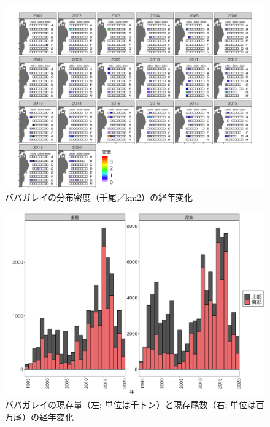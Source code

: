 \documentclass[11pt]{article} %
\begin{document}
\begin{linenumbers}
\begin{figure}[h]
  \centering
  \includegraphics[width = 14cm]{ババガレイdens.png}
  \caption{ババガレイの分布密度（千尾／km2）の経年変化}
\end{figure}

\begin{figure}[h]
  \centering
  \includegraphics[width = 14cm]{ババガレイtrend.png}
  \caption{ババガレイの現存量（左; 単位は千トン）と現存尾数（右; 単位は百万尾）の経年変化}
\end{figure}


\end{linenumbers}
\end{document}
